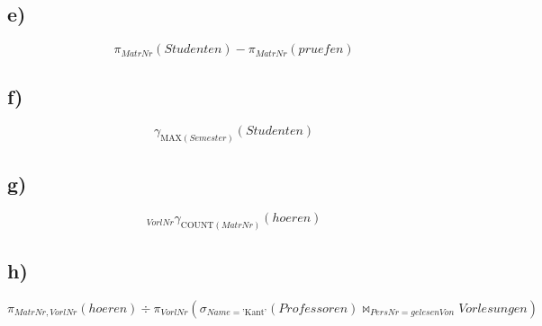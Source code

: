 \documentclass[12pt]{scrartcl}
\begin{document}
	\subsection*{e)}
	\[
		\pi_{MatrNr}(Studenten) - \pi_{MatrNr}(pruefen)
	\]

	\subsection*{f)}
	\[
		\gamma_{\text{MAX}(Semester)}(Studenten)
	\]

	\subsection*{g)}
	\[
		_{VorlNr}\gamma_{\text{COUNT}(MatrNr)}(hoeren)
	\]

	\subsection*{h)}
	\[
		\pi_{MatrNr, VorlNr}(hoeren) \div \pi_{VorlNr}(\sigma_{Name = \text{'Kant'}}(Professoren) \bowtie_{PersNr = gelesenVon} Vorlesungen)
	\]
\end{document}
